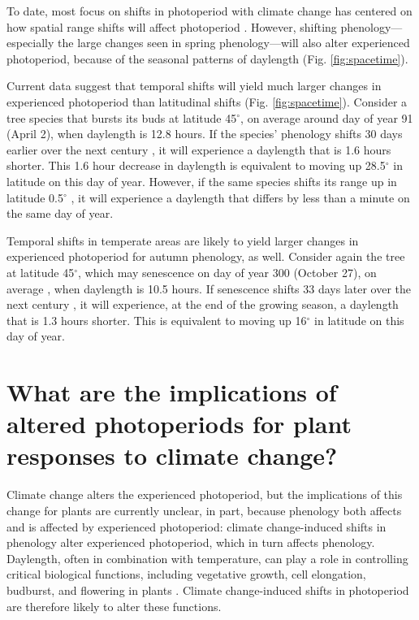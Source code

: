 \documentclass{article}
\begin{document}
\par To date, most focus on shifts in photoperiod with climate change has centered on how spatial range shifts will affect photoperiod \citep[e.g.,][]{huffeldt2020,way2015,saikkonen2012}. However, shifting phenology---especially the large changes seen in spring phenology---will also alter experienced photoperiod, because of the seasonal patterns of daylength (Fig. \ref{fig:spacetime}). 

\par Current data suggest that temporal shifts will yield much larger changes in experienced photoperiod than latitudinal shifts (Fig. \ref{fig:spacetime}).
Consider a tree species that bursts its buds at latitude 45$^{\circ}$, on average around day of year 91 (April 2), when daylength is 12.8 hours. If the species' phenology shifts 30 days earlier over the next century \citep[i.e., a rate of ~3 days per decade, as has been observed,][]{parmesan2003}, it will experience a daylength that is 1.6 hours shorter. This 1.6 hour decrease in daylength is equivalent to moving up 28.5$^{\circ}$ in latitude on this day of year. However, if the same species shifts its range up in latitude 0.5$^{\circ}$ \citep[i.e., 60 km over the next century, comparable to observed rates,][]{chen2011,parmesan2003}, it will experience a daylength that differs by less than a minute on the same day of year. 
\par Temporal shifts in temperate areas are likely to yield larger changes in experienced photoperiod for autumn phenology, as well. Consider again the tree at latitude 45$^{\circ}$, which may senescence on day of year 300 (October 27), on average \citep{gill2015}, when daylength is 10.5 hours. If senescence shifts 33 days later over the next century \citep[i.e., a rate of 3.3 days per decade, as has been observed,][]{gill2015}, it will experience, at the end of the growing season, a daylength that is 1.3 hours shorter. This is equivalent to moving up 16$^{\circ}$ in latitude on this day of year.
\section*{What are the implications of altered photoperiods for plant responses to climate change?}
Climate change alters the experienced photoperiod, but the implications of this change for plants are currently unclear, in part, because phenology both affects and is affected by experienced photoperiod: climate change-induced shifts in phenology alter experienced photoperiod, which in turn affects phenology. Daylength, often in combination with temperature, can play a role in controlling critical biological functions, including vegetative growth, cell elongation, budburst, and flowering in plants \citep{fu2019,Heide:2012aa,Heide:2011aa,Hsu:2011,sidaway2010,mimura2007,Linkosalo:2006aa,erwin1998,Ashby:1962aa}.
Climate change-induced shifts in photoperiod are therefore likely to alter these functions. 
\end{document}
